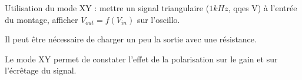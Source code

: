 \documentclass{../template/labo}
\begin{document}
\begin{manip}
{
Utilisation du mode XY :
mettre un signal triangulaire ($1kHz$, qqes V) à l'entrée du montage, afficher $V_{out}=f(V_{in})$ sur l'oscillo.

 Il peut être nécessaire de charger un peu la sortie avec une résistance.

Le mode XY permet de constater l'effet de la polarisation sur le gain et sur l'écrêtage du signal.
}
\end{manip}




\end{document}
